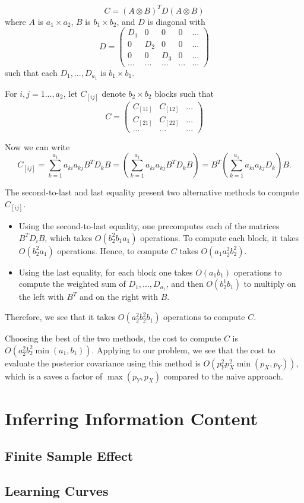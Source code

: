 \documentclass[12pt]{article}
\begin{document}
$$
C = (A \otimes B)^T D (A \otimes B)
$$
where $A$ is $a_1 \times a_2$, $B$ is $b_1 \times b_2$, and $D$ is diagonal with
$$
D = \begin{pmatrix} D_1 & 0 & 0 & 0 &... \\
0 & D_2 & 0 & 0 & ...\\
0 & 0 & D_3 & 0 & ...\\
... & ...& ... & ... & ...
\end{pmatrix}
$$
such that each $D_1,..., D_{a_1}$ is $b_1 \times b_1$.

For $i, j = 1..., a_2$, let $C_{[ij]}$ denote $b_2 \times b_2$ blocks such that
$$
C = \begin{pmatrix} C_{[11]} & C_{[12]} & ...\\
C_{[21]} & C_{[22]} & ... \\
... & ... & ...\end{pmatrix}
$$

Now we can write
$$
C_{[ij]} = \sum_{k=1}^{a_1} a_{ki}a_{kj} B^T D_k B 
= \left(\sum_{k=1}^{a_1} a_{ki} a_{kj} B^T D_k B \right)
= B^T \left(\sum_{k=1}^{a_1} a_{ki} a_{kj} D_k \right) B.
$$

The second-to-last and last equality present two alternative methods to compute $C_{[ij]}$.

\begin{itemize}
\item Using the second-to-last equality, one precomputes each of the matrices $B^T D_i B$, which takes $O(b_2^2 b_1 a_1)$ operations.  To compute each block, it takes $O(b_2^2 a_1)$ operations.  Hence, to compute $C$ takes $O(a_1 a_2^2 b_2^2)$.
\item Using the last equality, for each block one takes $O(a_1 b_1)$ operations to compute the weighted sum of $D_1,..., D_{a_1}$, and then $O(b_2^1 b_1)$ to multiply on the left with $B^T$ and on the right with $B$.
\end{itemize}
Therefore, we see that it takes $O(a_2^2 b_2^2 b_1)$ operations to compute $C$.

Choosing the best of the two methods, the cost to compute $C$ is $O(a_2^2 b_2^2 \min(a_1, b_1))$.
Applying to our problem, we see that the cost to evaluate the posterior covariance using this method is $O(p_Y^2 p_X^2 \min(p_X, p_Y))$, which is a saves a factor of $\max(p_Y, p_X)$ compared to the naive approach.


\section{Inferring Information Content}

\subsection{Finite Sample Effect}

\subsection{Learning Curves}
\end{document}
